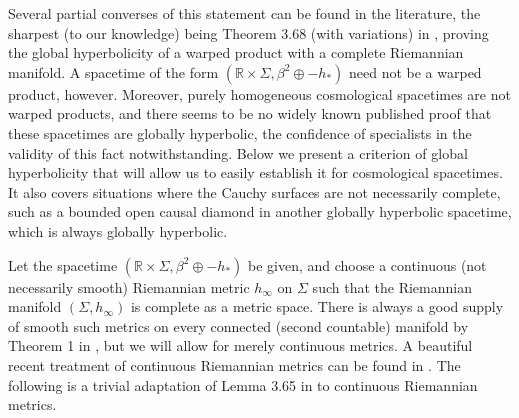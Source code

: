 \documentclass{article}
\begin{document}
Several partial converses of this statement can be found in the literature, the sharpest (to our knowledge) being Theorem 3.68 (with variations) in \cite{BeemEhrlichEasley}, proving the global hyperbolicity of a warped product with a complete Riemannian manifold. A spacetime of the form $(\mathbb{R}\times\Sigma,\beta^2\oplus-h_*)$ need not be a warped product, however. Moreover, purely homogeneous cosmological spacetimes are not warped products, and there seems to be no widely known published proof that these spacetimes are globally hyperbolic, the confidence of specialists in the validity of this fact notwithstanding. Below we present a criterion of global hyperbolicity that will allow us to easily establish it for cosmological spacetimes. It also covers situations where the Cauchy surfaces are not necessarily complete, such as a bounded open causal diamond in another globally hyperbolic spacetime, which is always globally hyperbolic.

Let the spacetime $(\mathbb{R}\times\Sigma,\beta^2\oplus-h_*)$ be given, and choose a continuous (not necessarily smooth) Riemannian metric $h_\infty$ on $\Sigma$ such that the Riemannian manifold $(\Sigma,h_\infty)$ is complete as a metric space. There is always a good supply of smooth such metrics on every connected (second countable) manifold by Theorem 1 in \cite{NomizuOzeki1961}, but we will allow for merely continuous metrics. A beautiful recent treatment of continuous Riemannian metrics can be found in \cite{Burtscher2015}. The following is a trivial adaptation of Lemma 3.65 in \cite{BeemEhrlichEasley} to continuous Riemannian metrics.
\end{document}
